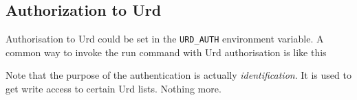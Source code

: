 \subsection{Authorization to Urd}
Authorisation to Urd could be set in the \texttt{URD\_AUTH}
environment variable.  A common way to invoke the run command with Urd
authorisation is like this
\begin{shell}
\end{shell}
Note that the purpose of the authentication is
actually \textsl{identification}.  It is used to get write access to
certain Urd lists.  Nothing more.


